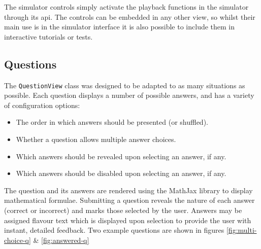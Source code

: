 \documentclass[bsc,twoside,singlespacing,parskip,logo,notimes,normalheadings]{infthesis}
\begin{document}
        The simulator controls simply activate the playback functions
        in the simulator through its \gls{api}. The controls can be
        embedded in any other view, so whilst their main use is in the
        simulator interface it is also possible to include them in
        interactive tutorials or tests.

        \subsection{Questions}
        The {\tt QuestionView} class was designed to be adapted to as
        many situations as possible. Each question displays a number
        of possible answers, and has a variety of configuration
        options:

        \begin{itemize}
        \item The order in which answers should be presented (or
          shuffled).
        \item Whether a question allows multiple answer choices.
        \item Which answers should be revealed upon selecting an
          answer, if any.
        \item Which answers should be disabled upon selecting an
          answer, if any.
        \end{itemize}

        The question and its answers are rendered using the MathJax
        library to display mathematical formulae. Submitting a
        question reveals the nature of each answer (correct or
        incorrect) and marks those selected by the user. Answers may
        be assigned flavour text which is displayed upon selection to
        provide the user with instant, detailed feedback. Two example
        questions are shown in figures \ref{fig:multi-choice-q} \&
        \ref{fig:answered-q}
\end{document}
